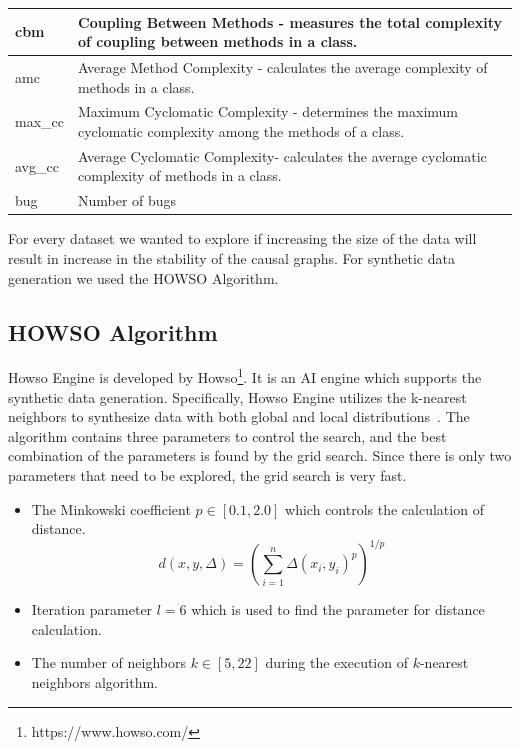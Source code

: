 \documentclass[sigconf,review,anonymous,nonacm=true]{acmart}
\begin{document}
\begin{table}[h]
\begin{tabular}{|l|p{7cm}|}
cbm & Coupling Between Methods - measures the total complexity of coupling between methods in a class.\\ \hline
amc & Average Method Complexity - calculates the average complexity of methods in a class. \\ \hline
max\_cc & Maximum Cyclomatic Complexity - determines the maximum cyclomatic complexity among the methods of a class. \\ \hline
avg\_cc & Average Cyclomatic Complexity- calculates the average cyclomatic complexity of methods in a class. \\ \hline
bug & Number of bugs \\ \hline
\end{tabular}
\end{table}

For every dataset we wanted to explore if increasing the size of the data will result in increase in the stability of the causal graphs. For synthetic data generation we used the HOWSO Algorithm.

\subsection{HOWSO Algorithm}
Howso Engine is developed by Howso\footnote{https://www.howso.com/}. It is an AI engine which supports the synthetic data generation. Specifically, Howso Engine utilizes the k-nearest neighbors to synthesize data with both global and local distributions~\cite{howso}. The algorithm contains three parameters to control the search, and the best combination of the parameters is found by the grid search. Since there is only two parameters that need to be explored, the grid search is very fast.
\begin{itemize}
    \item The Minkowski coefficient $p \in [ 0.1, 2.0 ]$ which controls the calculation of distance.
        \begin{equation}
            d(x, y, \Delta) = (\sum_{i=1}^{n} \Delta(x_i, y_i)^p)^{1/p}
        \end{equation}
    \item Iteration parameter $l = 6$ which is used to find the parameter for distance calculation.
    \item The number of neighbors $k \in [5, 22]$ during the execution of $k$-nearest neighbors algorithm.
\end{itemize}
\end{document}

